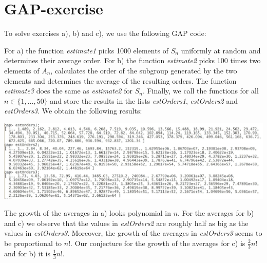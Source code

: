 \section{GAP-exercise}

To solve exercises a), b) and c), we use the following GAP code:



For a) the function \textit{estimate1} picks 1000 elements of $S_n$ uniformly at random and determines their average order. For b) the function \textit{estimate2} picks 100 times two elements of $A_n$, calculates the order of the subgroup generated by the two elements and determines the average of the resulting orders. The function \textit{estimate3} does the same as \textit{estimate2} for $S_n$. Finally, we call the functions for all $n \in \{1, \dots, 50\}$ and store the results in the lists \textit{estOrders1}, \textit{estOrders2} and \textit{estOrders3}. We obtain the following results:

\hspace*{-1cm}
\includegraphics[width=17cm]{ex5}

The growth of the averages in a) looks polynomial in $n$. For the averages for b) and c) we observe that the values in \textit{estOrders2} are roughly half as big as the values in \textit{estOrders3}. Moreover, the growth of the averages in \textit{estOrders3} seems to be proportional to $n!$. Our conjecture for the growth of the averages for c) is $\frac{2}{3} n!$ and for b) it is $\frac{1}{3} n!$. 